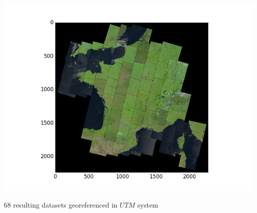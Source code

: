 \documentclass[c]{beamer}
\begin{document}
\begin{frame}
\begin{columns}[t]
\begin{column}{0.50\textwidth}
\begin{overlayarea}{\linewidth}{4cm}
  \centering\vfill
  \includegraphics[scale=0.25]{images/importing/france-covering.png}
\end{overlayarea}
\begin{overlayarea}{\linewidth}{1cm}
  \centering
  \scriptsize 68 resulting datasets georeferenced in $UTM$ system\par
\end{overlayarea}
\end{column}
\end{columns}

\end{frame}
\end{document}
